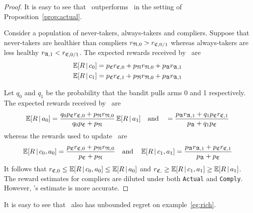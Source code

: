 \begin{proof}
	It is easy to see that \comply\, outperforms \chosen\, in the setting of Proposition~\ref{prop:actual}.
	
	Consider a population of never-takers, always-takers and compliers. Suppose that never-takers are healthier than compliers $r_{{\mathfrak N},0}> r_{{\mathfrak C},0/1}$ whereas always-takers are less healthy $r_{{\mathfrak A},1}<r_{{\mathfrak C},0/1}$.  
    The expected rewards received by \chosen\, are
	\begin{align}
		\operatorname*{\mathbb E}[R\,|\,c_0]
		& = p_{{\mathfrak C}}r_{{\mathfrak C},0} + p_{\mathfrak N} r_{{\mathfrak N},0} + p_{\mathfrak A} r_{{\mathfrak A},1}
		\\
		\operatorname*{\mathbb E}[R\,|\,c_1]
		& = p_{{\mathfrak C}}r_{{\mathfrak C},1} + p_{\mathfrak N} r_{{\mathfrak N},0} + p_{\mathfrak A} r_{{\mathfrak A},1}
	\end{align}
	
	Let $q_0$ and $q_1$ be the probability that the bandit pulls arms 0 and 1 respectively. The expected rewards received by \actual\, are
	\begin{equation}
		\operatorname*{\mathbb E}[R\,|\,a_0]
		 = \frac{q_0 p_{{\mathfrak C}}r_{{\mathfrak C},0} + p_{\mathfrak N} r_{{\mathfrak N},0}}{q_0p_{\mathfrak C} + p_{\mathfrak N}}		
		\operatorname*{\mathbb E}[R\,|\,a_1]
		\quad\text{and}\quad
		 = \frac{p_{\mathfrak A} r_{{\mathfrak A},1} + q_1p_{\mathfrak C} r_{{\mathfrak C},1}}{p_{\mathfrak A} + q_1 p_{\mathfrak C}}
	\end{equation}
	whereas the rewards used to update \comply\, are
	\begin{align}
		\operatorname*{\mathbb E}[R\,|\,c_0,a_0] = \frac{p_{{\mathfrak C}}r_{{\mathfrak C},0} + p_{\mathfrak N} r_{{\mathfrak N},0}}{p_{\mathfrak C} + p_{\mathfrak N}}
		\quad\text{and}\quad
		\operatorname*{\mathbb E}[R\,|\,c_1,a_1] = \frac{p_{\mathfrak A} r_{{\mathfrak A},1} + p_{{\mathfrak C}}r_{{\mathfrak C},1}}{p_{\mathfrak A} + p_{\mathfrak C}}
	\end{align}
	It follows that $r_{{\mathfrak C},0} \leq\operatorname*{\mathbb E}[R\,|\,c_0,a_0]\leq \operatorname*{\mathbb E}[R\,|\,a_0]$ and $r_{{\mathfrak C},} \geq\operatorname*{\mathbb E}[R\,|\,c_1,a_1] \geq \operatorname*{\mathbb E}[R\,|\,a_1]$.
	The reward estimates for compliers are diluted under both \texttt{Actual} and \texttt{Comply}. However, \comply's estimate is more accurate.
\end{proof}

It is easy to see that \comply\, also has unbounded regret on example~\ref{eg:rich}.


